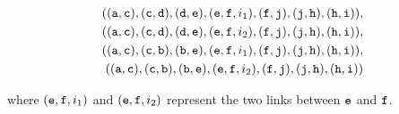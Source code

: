 \begin{align*}
((\texttt{a}, \texttt{c}), (\texttt{c}, \texttt{d}), (\texttt{d}, \texttt{e}), (\texttt{e}, \texttt{f}, i_1), (\texttt{f}, \texttt{j}), (\texttt{j}, \texttt{h}), (\texttt{h}, \texttt{i})), \\
((\texttt{a}, \texttt{c}), (\texttt{c}, \texttt{d}), (\texttt{d}, \texttt{e}), (\texttt{e}, \texttt{f}, i_2), (\texttt{f}, \texttt{j}), (\texttt{j}, \texttt{h}), (\texttt{h}, \texttt{i})), \\
((\texttt{a}, \texttt{c}), (\texttt{c}, \texttt{b}), (\texttt{b}, \texttt{e}), (\texttt{e}, \texttt{f}, i_1), (\texttt{f}, \texttt{j}), (\texttt{j}, \texttt{h}), (\texttt{h}, \texttt{i})), \\
((\texttt{a}, \texttt{c}), (\texttt{c}, \texttt{b}), (\texttt{b}, \texttt{e}), (\texttt{e}, \texttt{f}, i_2), (\texttt{f}, \texttt{j}), (\texttt{j}, \texttt{h}), (\texttt{h}, \texttt{i})) \\
\end{align*}

where $(\texttt{e}, \texttt{f}, i_1)$ and $(\texttt{e}, \texttt{f}, i_2)$ represent the two links between $\texttt{e}$ and $\texttt{f}$.

